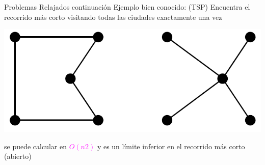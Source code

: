 \begin{frame}{Problemas Relajados continuación}
Ejemplo bien conocido:  (TSP)
Encuentra el recorrido más corto visitando todas las ciudades exactamente una vez\\
\begin{center}
\includegraphics[scale=0.4]{35_image_mst.PNG}\\
\end{center}

 se puede calcular en \textcolor{magenta}{$O (n2)$} 
y es un límite inferior en el recorrido más corto (abierto)

\end{frame}